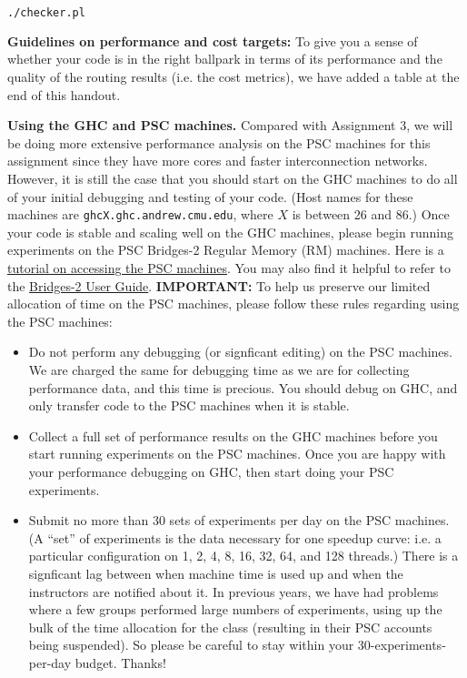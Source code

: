 \documentclass[11pt]{article}
\begin{document}
\begin{lstlisting}[language=bash]
./checker.pl
\end{lstlisting}

\textbf{Guidelines on performance and cost targets:} To give you a sense of whether your code is in the right ballpark in terms of its performance and the quality of the routing results (i.e. the cost metrics), we have added a table at the end of this handout.

\textbf{Using the GHC and PSC machines.} Compared with Assignment 3, we will be doing more extensive performance analysis on the PSC machines for this assignment since they have more cores and faster interconnection networks. However, it is still the case that you should start on the GHC machines to do all of your initial debugging and testing of your code. (Host names for these machines are \texttt{ghcX.ghc.andrew.cmu.edu}, where $X$ is between 26 and 86.) Once your code is stable and scaling well on the GHC machines, please begin running experiments on the PSC Bridges-2 Regular Memory (RM) machines. Here is a \href{https://www.cs.cmu.edu/afs/cs/academic/class/15418-s24/www/doc/PSC-machines.pdf}{tutorial on accessing the PSC machines}. You may also find it helpful to refer to the \href{https://www.psc.edu/resources/bridges-2/user-guide/}{Bridges-2 User Guide}. \textbf{IMPORTANT:} To help us preserve our limited allocation of time on the PSC machines, please follow these rules regarding using the PSC machines:

\begin{itemize}
\item Do not perform any debugging (or signficant editing) on the PSC machines. We are charged the same for debugging time as we are for collecting performance data, and this time is precious. You should debug on GHC, and only transfer code to the PSC machines when it is stable.

\item Collect a full set of performance results on the GHC machines before you start running experiments on the PSC machines. Once you are happy with your performance debugging on GHC, then start doing your PSC experiments.

\item Submit no more than 30 sets of experiments per day on the PSC machines. (A ``set'' of experiments is the data necessary for one speedup curve: i.e. a particular configuration on 1, 2, 4, 8, 16, 32, 64, and 128 threads.) There is a signficant lag between when machine time is used up and when the instructors are notified about it. In previous years, we have had problems where a few groups performed large numbers of experiments, using up the bulk of the time allocation for the class (resulting in their PSC accounts being suspended). So please be careful to stay within your 30-experiments-per-day budget. Thanks!
\end{itemize}
\end{document}
